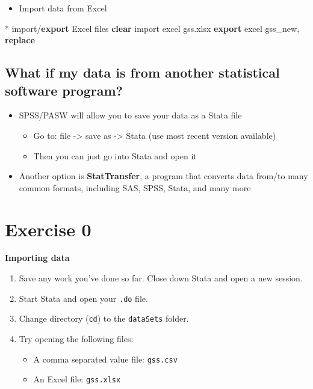 \documentclass[]{book}
\newenvironment{Shaded}{\begin{snugshade}}{\end{snugshade}}
\newcommand{\KeywordTok}[1]{\textcolor[rgb]{0.13,0.29,0.53}{\textbf{#1}}}
\newcommand{\NormalTok}[1]{#1}
\providecommand{\tightlist}{%
  \setlength{\itemsep}{0pt}\setlength{\parskip}{0pt}}
\begin{document}
\begin{itemize}
\tightlist
\item
  Import data from Excel
\end{itemize}

\begin{Shaded}
\begin{Highlighting}[]
\NormalTok{* import/}\KeywordTok{export}\NormalTok{ Excel files}
\KeywordTok{clear}
\NormalTok{import excel gss.xlsx}
\KeywordTok{export}\NormalTok{ excel gss_new, }\KeywordTok{replace}
\end{Highlighting}
\end{Shaded}

\hypertarget{what-if-my-data-is-from-another-statistical-software-program}{%
\subsection{What if my data is from another statistical software program?}\label{what-if-my-data-is-from-another-statistical-software-program}}

\begin{itemize}
\tightlist
\item
  SPSS/PASW will allow you to save your data as a Stata file

  \begin{itemize}
  \tightlist
  \item
    Go to: file -\textgreater{} save as -\textgreater{} Stata (use most recent version available)
  \item
    Then you can just go into Stata and open it
  \end{itemize}
\item
  Another option is \textbf{StatTransfer}, a program that converts data from/to many common formats, including SAS, SPSS, Stata, and many more
\end{itemize}

\hypertarget{exercise-0-5}{%
\section{Exercise 0}\label{exercise-0-5}}

\textbf{Importing data}

\begin{enumerate}
\def\labelenumi{\arabic{enumi}.}
\tightlist
\item
  Save any work you've done so far. Close down Stata and open a new session.
\item
  Start Stata and open your \texttt{.do} file.
\item
  Change directory (\texttt{cd}) to the \texttt{dataSets} folder.
\item
  Try opening the following files:

  \begin{itemize}
  \tightlist
  \item
    A comma separated value file: \texttt{gss.csv}
  \item
    An Excel file: \texttt{gss.xlsx}
  \end{itemize}
\end{enumerate}
\end{document}
